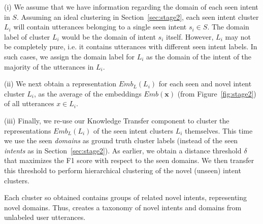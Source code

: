 (i) We assume that we have information regarding the domain of each seen intent in $S$. Assuming an ideal clustering in Section~\ref{sec:stage2}, each seen intent cluster $L_i$ will contain utterances belonging to a single seen intent $s_i \in S$. The domain label of cluster $L_i$ would be the domain of intent $s_i$ itself. However, $L_i$ may not be completely pure, i.e. it contains utterances with different seen intent labels. In such cases, we assign the domain label for $L_i$ as the domain of the intent of the majority of the utterances in $L_i$. 

(ii) We next obtain a representation $Emb_L(L_i)$ for each seen and novel intent cluster $L_i$, as the average of the embeddings $Emb(\bm{x})$ (from Figure~\ref{fig:stage2}) of all utterances $x \in L_i$. %

(iii) Finally, we re-use our Knowledge Transfer component to cluster the representations $Emb_L(L_i)$ of the seen intent clusters $L_i$ themselves. This time we use the seen \textit{domains} as ground truth cluster labels (instead of the seen \textit{intents} as in Section~\ref{sec:stage2}). As earlier, we obtain a distance threshold $\delta$ that maximizes the F1 score with respect to the seen domains. We then transfer this threshold to perform hierarchical clustering of the novel (unseen) intent clusters. 

\smallskip

\noindent Each cluster so obtained contains groups of related novel intents, representing novel domains. 
Thus, \mname{} creates a taxonomy of novel intents and domains from unlabeled user utterances.




